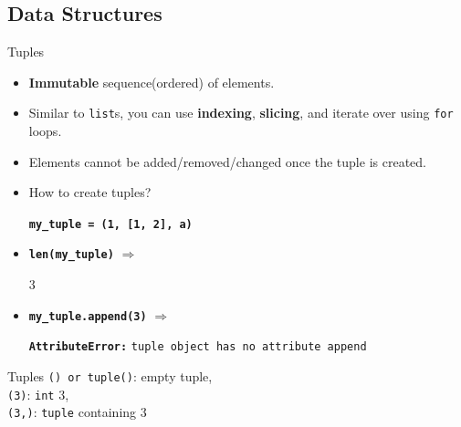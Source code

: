     \subsection{Data Structures}
    \begin{frame}{Tuples}
        \LARGE
        \begin{itemize}
            \item \textbf{Immutable} sequence(ordered) of elements.

            \item Similar to \texttt{list}s, you can use \textbf{indexing}, \textbf{slicing}, and iterate over using \texttt{for} loops.

            \item Elements cannot be added/removed/changed once the tuple is created.

            \item How to create tuples?

             \textbf{\texttt{my\_tuple = (1, [1, 2], \textquotesingle a\textquotesingle )}}

            \item \textbf{\texttt{len(my\_tuple)}} $\Rightarrow$

             3
            \item \textbf{\texttt{my\_tuple.append(3)}} $\Rightarrow$

             \textbf{\texttt{AttributeError:}} \texttt{\textquotesingle tuple\textquotesingle \ object has no attribute \textquotesingle append\textquotesingle}
        \end{itemize}
    \end{frame}

    \begin{frame}{Tuples}
        \Large
        \texttt{() or tuple()}: empty tuple, \\
        \texttt{(3)}:
        \texttt{int} 3,\\
        \texttt{(3,)}:
        \texttt{tuple} containing 3\\
        \inputminted[frame=single,framesep=2pt]{python3}{../Lecture6/code-examples/tuples.py}
    \end{frame}

